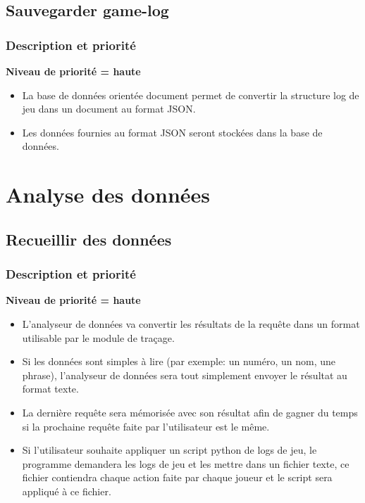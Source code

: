 \documentclass{scrreprt}
\begin{document}
\subsection{Sauvegarder game-log}

\subsubsection{Description et priorité}
\textbf{Niveau de priorité = haute}\\
\begin{itemize}
\item La base de données orientée document permet de convertir la structure log de jeu dans un document au format JSON.
\item Les données fournies au format JSON seront stockées dans la base de données.
\end{itemize}
\section{Analyse des données}
\subsection{Recueillir des données}
\subsubsection{Description et priorité}
\textbf{Niveau de priorité = haute}\\
\begin{itemize}

\item L'analyseur de données va convertir les résultats de la requête dans un format utilisable par le module de traçage.
\item Si les données sont simples à lire (par exemple: un numéro, un nom, une phrase), l'analyseur de données sera tout simplement envoyer le résultat au format texte.
\item La dernière requête sera mémorisée avec son résultat afin de gagner du temps si la prochaine requête faite par l'utilisateur est le même.
\item Si l'utilisateur souhaite appliquer un script python de logs de jeu, le programme demandera les logs de jeu et les mettre dans un fichier texte, ce fichier contiendra chaque action faite par chaque joueur et le script sera appliqué à ce fichier.
\end{itemize}
\end{document}
